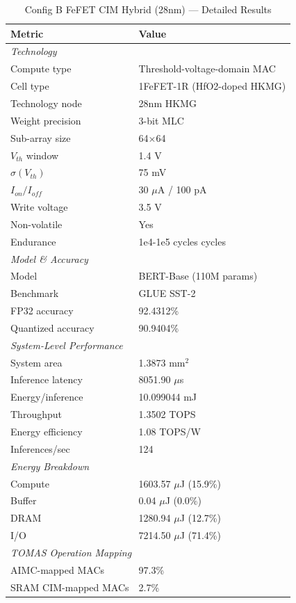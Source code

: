 \begin{table}[htbp]
\centering
\caption{Config B FeFET CIM Hybrid (28nm) --- Detailed Results}
\label{tab:config_b_detail}
\begin{tabular}{ll}
\toprule
\textbf{Metric} & \textbf{Value} \\
\midrule
\multicolumn{2}{l}{\textit{Technology}} \\
\quad Compute type & Threshold-voltage-domain MAC \\
\quad Cell type & 1FeFET-1R (HfO2-doped HKMG) \\
\quad Technology node & 28nm HKMG \\
\quad Weight precision & 3-bit MLC \\
\quad Sub-array size & 64$\times$64 \\
\quad $V_{{th}}$ window & 1.4 V \\
\quad $\sigma(V_{{th}})$ & 75 mV \\
\quad $I_{{on}}/I_{{off}}$ & 30 $\mu$A / 100 pA \\
\quad Write voltage & 3.5 V \\
\quad Non-volatile & Yes \\
\quad Endurance & 1e4-1e5 cycles cycles \\
\midrule
\multicolumn{2}{l}{\textit{Model \& Accuracy}} \\
\quad Model & BERT-Base (110M params) \\
\quad Benchmark & GLUE SST-2 \\
\quad FP32 accuracy & 92.4312\% \\
\quad Quantized accuracy & 90.9404\% \\
\midrule
\multicolumn{2}{l}{\textit{System-Level Performance}} \\
\quad System area & 1.3873 mm$^2$ \\
\quad Inference latency & 8051.90 $\mu$s \\
\quad Energy/inference & 10.099044 mJ \\
\quad Throughput & 1.3502 TOPS \\
\quad Energy efficiency & 1.08 TOPS/W \\
\quad Inferences/sec & 124 \\
\midrule
\multicolumn{2}{l}{\textit{Energy Breakdown}} \\
\quad Compute & 1603.57 $\mu$J (15.9\%) \\
\quad Buffer & 0.04 $\mu$J (0.0\%) \\
\quad DRAM & 1280.94 $\mu$J (12.7\%) \\
\quad I/O & 7214.50 $\mu$J (71.4\%) \\
\midrule
\multicolumn{2}{l}{\textit{TOMAS Operation Mapping}} \\
\quad AIMC-mapped MACs & 97.3\% \\
\quad SRAM CIM-mapped MACs & 2.7\% \\
\bottomrule
\end{tabular}
\end{table}
